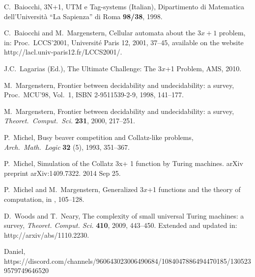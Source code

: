 \documentclass[10pt]{article}
\begin{document}
\begin{thebibliography}{99}
 C.\ Baiocchi, 3N+1, UTM e Tag-systems (Italian),
Dipartimento di Matematica dell'Universit\`a ``La Sapienza'' di Roma {\bf 98/38}, 1998.

 C.\ Baiocchi and M.\ Margenstern, Cellular automata about
the $3x + 1$ problem, in: Proc.\ LCCS'2001, Universit\'e Paris 12, 2001, 37--45,
available on the website http://lacl.univ-paris12.fr/LCCS2001/.

 J.C.\ Lagarias (Ed.), The Ultimate Challenge: The 3$x$+1 Problem, AMS, 2010.

 M.\ Margenstern, Frontier between decidability and undecidability: a survey,
Proc.\ MCU'98, Vol.\ 1, ISBN 2-9511539-2-9, 1998, 141--177.

 M.\ Margenstern, Frontier between decidability and undecidability:
a survey, \emph{Theoret.\ Comput.\ Sci.} {\bf 231}, 2000, 217--251.

 P.\ Michel, Busy beaver competition and Collatz-like problems,
\emph{Arch.\ Math.\ Logic} {\bf 32} (5), 1993, 351--367.

 P.\ Michel, Simulation of the Collatz 3x+ 1 function by Turing machines. arXiv preprint arXiv:1409.7322. 2014 Sep 25.

 P.\ Michel and M.\ Margenstern, Generalized 3$x$+1 functions and the theory of computation,
in \cite{La10}, 105--128.

 D.\ Woods and T.\ Neary, The complexity of small universal Turing machines:
a survey, \emph{Theoret. Comput. Sci.} {\bf 410}, 2009, 443--450.
Extended and updated in: http://arxiv/abs/1110.2230.

 Daniel, https://discord.com/channels/960643023006490684/1084047886494470185/1305239579749646520

\end{thebibliography}
\end{document}
